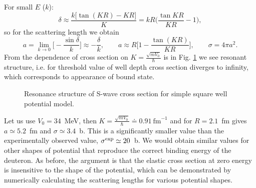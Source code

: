 \documentclass[11pt,a4paper]{article}
\begin{document}
For small $E$ ($k$):
\[
\delta\approx\frac{k\big[\tan(KR)-KR\big]}{K}=kR\Big(\frac{\tan KR}{KR}-1\Big), 
\]
so for the scattering length we obtain 
\[
a=\lim_{k\to0}\Big[-\frac{\sin\delta}{k}\Big]\approx-\frac{\delta}{k},
\qquad
a\approx R\Big[1-\frac{\tan(KR)}{KR}\Big],
\qquad \sigma=4\pi a^2 .
\]
From the dependence of cross section on $K=\frac{\sqrt{mV_0}}{\hbar}$ is in 
Fig. \ref{resonance_cross_section} we see resonant structure, i.e. for threshold value of well depth cross section diverges to infinity, which corresponds to appearance of bound state. 

\begin{figure}
\begin{center}
\end{center}
\caption{Resonance structure of S-wave cross section for simple square well potential model.}
\label{resonance_cross_section}
\end{figure}
Let us use $V_0=34$~MeV, then $K=\frac{\sqrt{mV_0}}{\hbar}\doteq0.91\ \text{fm}^{-1}$ and for $R=2.1$~fm gives $a\simeq5.2$~fm and $\sigma\simeq3.4$~b. This is a significantly smaller value than the experimentally observed value, $\sigma^{\rm exp}\simeq20$~b. We would obtain similar values for other shapes of potential that reproduce the correct binding energy of the deuteron. As before, the argument is that the elastic cross section at zero energy is insensitive to the shape of the potential, which can be demonstrated by numerically calculating the scattering lengths for various potential shapes.  
\end{document}
